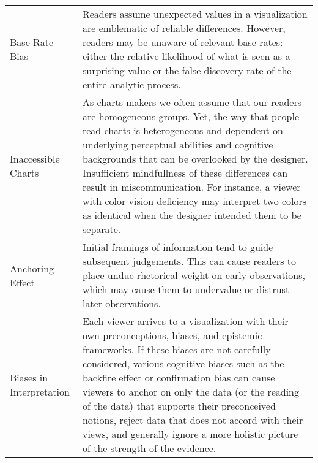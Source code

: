 \begin{table*}[ht!]
\begin{tabular}{>{\raggedright\arraybackslash}p{1.8cm}p{14.7cm}}
   \rowcolor{colord}\multirow{4}{0em}{\hspace{-0.6cm}\rotatebox{90}{\normalsize{Reading}}}Base Rate Bias  & Readers assume unexpected values in a visualization are emblematic of reliable differences. However, readers may be unaware of relevant base rates: either the relative likelihood of what is seen as a surprising value or the false discovery rate of the entire analytic process. \cite{correll2016surprise,pu2018garden, zgraggen2018investigating}\\
 \rowcolor{colord-opaque}Inaccessible Charts  & As charts makers we often assume that our readers are homogeneous groups. Yet, the way that people read charts is heterogeneous and dependent on underlying perceptual abilities and cognitive backgrounds that can be overlooked by the designer. Insufficient mindfullness of these differences can result in miscommunication. For instance, a viewer with color vision deficiency may interpret two colors as identical when the designer intended them to be separate. \cite{lundgard2019Sociotechnical, plaisant2005information}\\
 \rowcolor{colord}Anchoring Effect  & Initial framings of information tend to guide subsequent judgements. This can cause readers to place undue rhetorical weight on early observations, which may cause them to undervalue or distrust later observations.  \cite{ritchie2019lie, hullman2011visualization}\\
 \rowcolor{colord-opaque}Biases in  Interpretation  & Each viewer arrives to a visualization with their own preconceptions, biases, and epistemic frameworks. If these biases are not carefully considered, various cognitive biases such as the backfire effect or confirmation bias can cause viewers to anchor on only the data (or the reading of the data) that supports their preconceived notions, reject data that does not accord with their views, and generally ignore a more holistic picture of the strength of the evidence. \cite{dignazio2019draft, d2016feminist, few2019loom,wall2017warning,valdez2017framework}\\
\end{tabular}
\label{table:mirage-table}
\end{table*}
